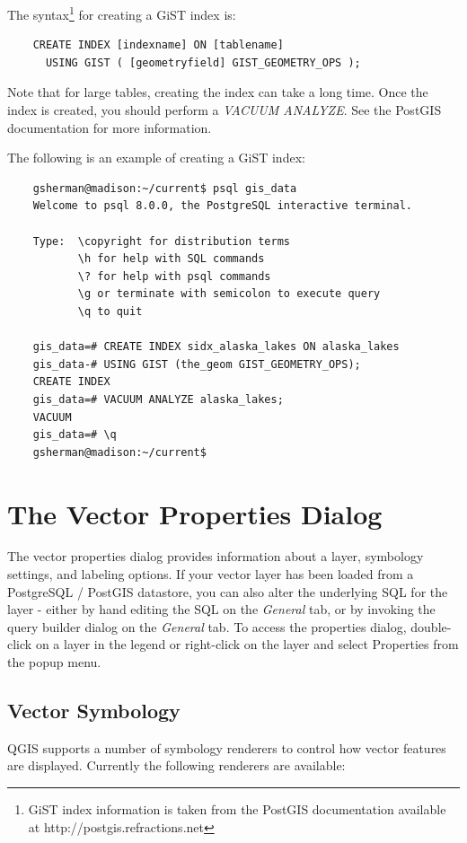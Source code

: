 The syntax\footnote{GiST index information is taken from the PostGIS
documentation available at http://postgis.refractions.net} for creating a GiST index is:
\begin{verbatim}
    CREATE INDEX [indexname] ON [tablename] 
      USING GIST ( [geometryfield] GIST_GEOMETRY_OPS );
\end{verbatim}
Note that for large tables, creating the index can take a long time. Once the
index is created, you should perform a \textit{VACUUM ANALYZE}. See the
PostGIS documentation for more information.

The following is an example of creating a GiST index:
\begin{verbatim}
    gsherman@madison:~/current$ psql gis_data
    Welcome to psql 8.0.0, the PostgreSQL interactive terminal.

    Type:  \copyright for distribution terms
           \h for help with SQL commands
           \? for help with psql commands
           \g or terminate with semicolon to execute query
           \q to quit

    gis_data=# CREATE INDEX sidx_alaska_lakes ON alaska_lakes
    gis_data-# USING GIST (the_geom GIST_GEOMETRY_OPS);
    CREATE INDEX
    gis_data=# VACUUM ANALYZE alaska_lakes;
    VACUUM
    gis_data=# \q
    gsherman@madison:~/current$
\end{verbatim}
\section{The Vector Properties
Dialog}\label{sec:vectorprops} The
vector properties dialog provides information about a layer, symbology
settings, and labeling options. If your vector layer has been loaded from a
PostgreSQL / PostGIS datastore, you can also alter the underlying SQL for the
layer - either by hand editing the SQL on the \textit{General} tab, or by
invoking the query builder dialog on the \textit{General} tab. To access the
properties dialog, double-click on a layer in the legend or right-click on the
layer and select Properties from the popup menu.

\subsection{Vector Symbology}\label{sec:symbology}

QGIS supports a number of symbology renderers to control how
vector features are displayed. Currently the following renderers
are available:

